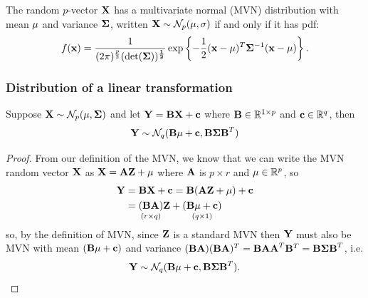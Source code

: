 \documentclass[10pt, a4paper]{article}
\begin{document}
\begin{proposition}
    The random $p$-vector $\mathbf{X}$ has a multivariate normal
    (MVN)
    distribution with mean $\mathbf{\mu}$ and variance $\mathbf{\Sigma}$,
    written $\mathbf{X} \sim \mathcal{N}_p(\mathbf{\mu}, \mathbf{\sigma})$ if and only if it has pdf:
    \[
    f(\mathbf{x}) = \frac{1}{(2\pi) ^ {\frac{p}{2}}(\det(\mathbf{\Sigma)) ^ {\frac{1}{2}}}}\exp\left\{-\frac{1}{2}(\mathbf{x} - \mathbf{\mu}) ^ T\mathbf{\Sigma} ^ {-1}(\mathbf{x} - \mathbf{\mu})\right\}.
    \]
\end{proposition}

\subsubsection{Distribution of a linear transformation}
\begin{theorem}
    Suppose $\mathbf{X} \sim \mathcal{N}_p(\mathbf{\mu}, \mathbf{\Sigma})$ and let $\mathbf{Y} = \mathbf{BX} + \mathbf{c}$ where $\mathbf{B} \in \mathbb{R} ^ {1 \times p}$ and $\mathbf{c} \in \mathbb{R} ^ q$,
    then
    \[
    \mathbf{Y} \sim \mathcal{N}_q(\mathbf{B\mu} + \mathbf{c}, \mathbf{B\Sigma B} ^ T)
    \]
    
    \begin{proof}
        From our definition of the MVN,
        we know that we can write the MVN random vector $\mathbf{X}$ as $\mathbf{X} = \mathbf{AZ} + \mathbf{\mu}$ where $\mathbf{A}$ is $p \times r$ and $\mathbf{\mu} \in \mathbb{R} ^ p$,
        so
        \begin{align*}
            \mathbf{Y} &= \mathbf{BX} + \mathbf{c} = \mathbf{B}(\mathbf{AZ} + \mathbf{\mu}) + \mathbf{c} \\
            &= \underset{(r \times q)}{(\mathbf{BA})}\mathbf{Z} + \underset{(q \times 1)}{(\mathbf{B\mu} + \mathbf{c})}
        \end{align*}
        so,
        by the definition of MVN,
        since $\mathbf{Z}$ is a standard MVN then $\mathbf{Y}$ must also be MVN with mean $(\mathbf{B\mu} + \mathbf{c})$ and variance $(\mathbf{BA})(\mathbf{BA}) ^ T = \mathbf{BAA} ^ T\mathbf{B} ^ T = \mathbf{B\Sigma B} ^ T$,
        i.e.
        \[
        \mathbf{Y} \sim \mathcal{N}_q(\mathbf{B\mu} + \mathbf{c}, \mathbf{B\Sigma B} ^ T).
        \]
    \end{proof}
\end{theorem}
\end{document}
